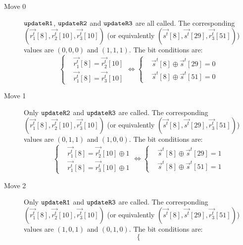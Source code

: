\begin{description}
  \item[Move 0] $\tt{updateR1}$, $\tt{updateR2}$ and $\tt{updateR3}$ are all called.
  The corresponding $(\vec{r_1^t}[8],\vec{r_2^t}[10],\vec{r_3^t}[10])$ (or equivalently $(\vec{s^t}[8],\vec{s^t}[29],\vec{r_3^t}[51])$) values are $(0,0,0)$ and $(1,1,1)$.
  The bit conditions are:
  \begin{equation}\label{eq:Move0BitCondition}
    \left\{
    \begin{aligned}
    &\vec{r_1^t}[8]=\vec{r_2^t}[10]\\
    &\vec{r_1^t}[8]=\vec{r_3^t}[10]
    \end{aligned}
    \right.
    \Leftrightarrow
    \left\{
    \begin{aligned}
    &\vec{s}^t[8]\oplus \vec{s}^t[29]=0\\
    &\vec{s}^t[8]\oplus \vec{s}^t[51]=0
    \end{aligned}
    \right.
  \end{equation}
  \item[Move 1] Only $\tt{updateR2}$ and $\tt{updateR3}$ are called.
  The corresponding $(\vec{r_1^t}[8],\vec{r_2^t}[10],\vec{r_3^t}[10])$ (or equivalently $(\vec{s^t}[8],\vec{s^t}[29],\vec{r_3^t}[51])$) values are $(0,1,1)$ and $(1,0,0)$.
  The bit conditions are:
  \begin{equation}\label{eq:Move1BitCondition}
    \left\{
    \begin{aligned}
    &\vec{r_1^t}[8]=\vec{r_2^t}[10]\oplus 1\\
    &\vec{r_1^t}[8]=\vec{r_3^t}[10]\oplus 1
    \end{aligned}
    \right.
    \Leftrightarrow
    \left\{
    \begin{aligned}
    &\vec{s}^t[8] \oplus \vec{s}^t[29]=1\\
    &\vec{s}^t[8] \oplus \vec{s}^t[51]=1
    \end{aligned}
    \right.
  \end{equation}
  \item[Move 2] Only $\tt{updateR1}$ and $\tt{updateR3}$ are called. %
  The corresponding $(\vec{r_1^t}[8],\vec{r_2^t}[10],\vec{r_3^t}[10])$ (or equivalently $(\vec{s^t}[8],\vec{s^t}[29],\vec{r_3^t}[51])$) values are $(1,0,1)$ and $(0,1,0)$.
  The bit conditions are:
  \begin{equation}\label{eq:Move2BitCondition}
    \left\{

\end{equation}
\end{description}
